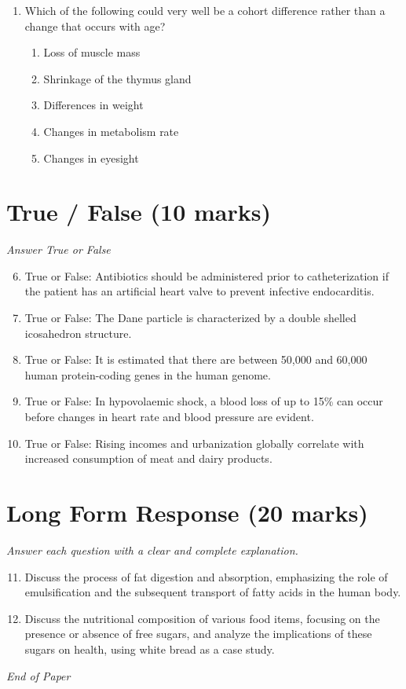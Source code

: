 \documentclass[12pt]{article}
\begin{document}
\begin{enumerate}[label=\arabic*.]
\begin{enumerate}[label=(\alph*)]
    \item Eco-friendly
    \item Sunshine
    \item Forest
    \item Rapid decay
    \item Organic
\end{enumerate}
\item Which of the following could very well be a cohort difference rather than a change that occurs with age?
\begin{enumerate}[label=(\alph*)]
    \item Loss of muscle mass
    \item Shrinkage of the thymus gland
    \item Differences in weight
    \item Changes in metabolism rate
    \item Changes in eyesight
\end{enumerate}
\end{enumerate}

\section*{True / False (10 marks)}
\textit{Answer True or False}
\begin{enumerate}[label=\arabic*.]
\setcounter{enumi}{5}
\item True or False: Antibiotics should be administered prior to catheterization if the patient has an artificial heart valve to prevent infective endocarditis.
\item True or False: The Dane particle is characterized by a double shelled icosahedron structure.
\item True or False: It is estimated that there are between 50,000 and 60,000 human protein-coding genes in the human genome.
\item True or False: In hypovolaemic shock, a blood loss of up to 15\% can occur before changes in heart rate and blood pressure are evident.
\item True or False: Rising incomes and urbanization globally correlate with increased consumption of meat and dairy products.
\end{enumerate}

\section*{Long Form Response (20 marks)}
\textit{Answer each question with a clear and complete explanation.}
\begin{enumerate}[label=\arabic*.]
\setcounter{enumi}{10}
\item Discuss the process of fat digestion and absorption, emphasizing the role of emulsification and the subsequent transport of fatty acids in the human body.
\item Discuss the nutritional composition of various food items, focusing on the presence or absence of free sugars, and analyze the implications of these sugars on health, using white bread as a case study.
\end{enumerate}

\vfill
\noindent\textit{End of Paper}
\end{document}
